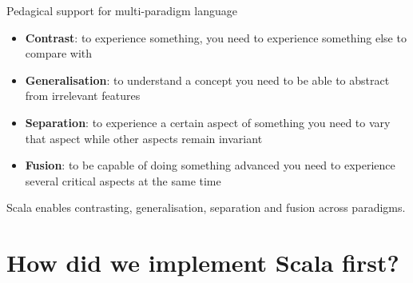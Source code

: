 \documentclass[aspectratio=169]{beamer}
\newcommand{\Section}[1]{\titleimagecolor{red}\section{#1}}
\newenvironment{Slide}[1]%
  {\begin{frame}[environment=Slide]{#1}}
  {\end{frame}}%
\begin{document}
\begin{Slide}{Pedagical support for multi-paradigm language}
\begin{minipage}{0.85\textwidth}
\begin{itemize}
    \begin{itemize}
      \item \textbf{Contrast}: to experience something, you need to experience something else to compare with    
      \item \textbf{Generalisation}: to understand a concept you need to be able to abstract from irrelevant features    
      \item \textbf{Separation}: to experience a certain aspect of something you need to vary that aspect while other aspects remain invariant    
      \item \textbf{Fusion}: to be capable of doing something advanced you need to experience several critical aspects at the same time    
    \end{itemize}
  \end{itemize}
\end{minipage}

\vspace{1em} Scala enables contrasting, generalisation, separation and fusion across paradigms.

\end{Slide}

\Section{How did we implement Scala first?}
\end{document}
